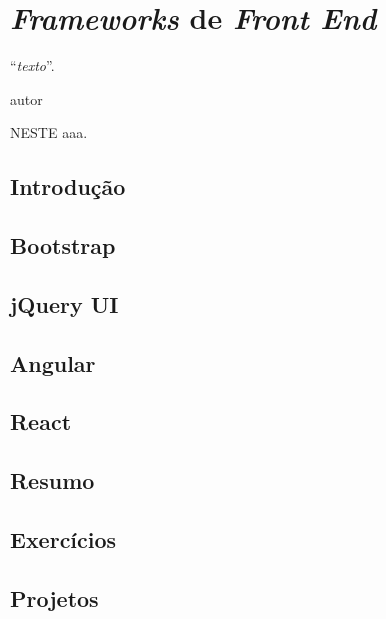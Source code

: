 \chapter{\textit{Frameworks} de \textit{Front End}}\label{cap:frameworksFront}
\epigraph{``\textit{texto}''.}{autor}

\lettrine[lines=4, lhang=0.1, lraise=0, loversize=0.2, findent=0.1em]{\textcolor{corAzulTema}{N}}{ESTE} aaa.

\section{Introdução}

\section{Bootstrap}

\section{jQuery UI}

\section{Angular}

\section{React}

\section{Resumo}

\section{Exercícios}

\section{Projetos}
